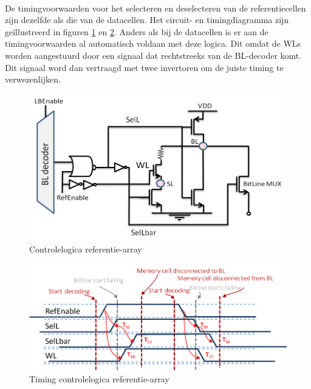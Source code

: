 \paragraph{}
De timingvoorwaarden voor het selecteren en deselecteren van de referentiecellen zijn dezelfde als die van de datacellen. Het circuit- en timingdiagramma zijn geïllustreerd in figuren \ref{fig:lbref_timing1} en \ref{fig:lbref_timing2}. Anders als bij de datacellen is er aan de timingvoorwaarden al automatisch voldaan met deze logica. Dit omdat de WLs worden aangestuurd door een signaal dat rechtstreeks van de BL-decoder komt. Dit signaal word dan vertraagd met twee invertoren om de juiste timing te verwezenlijken.


\begin{figure}[!ht]
  \centering
  \includegraphics[scale=0.6]{../fig/hfdstk-timing-lbref1.png}
  \caption[Referentie-array:logica]{Controlelogica referentie-array}
  \label{fig:lbref_timing1}
\end{figure}

\begin{figure}[!ht]
  \centering
  \includegraphics[scale=0.9]{../fig/hfdstk-timing-lbref2.png}
  \caption[Referentie-array:timing]{Timing controlelogica referentie-array}
  \label{fig:lbref_timing2}
\end{figure}

